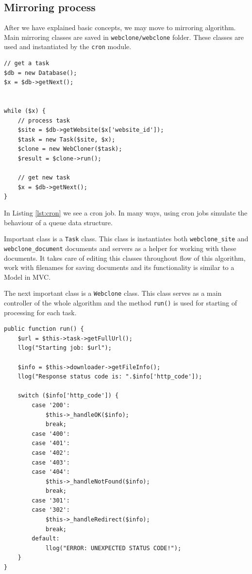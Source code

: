 \subsection{Mirroring process}
After we have explained basic concepts, we may move to mirroring algorithm. Main mirroring classes are saved in \texttt{webclone/webclone} folder. These classes are used and instantiated by the \texttt{cron} module.

\begin{lstlisting}[caption={Code executed for each document in cron},label={lst:cron}]
// get a task
$db = new Database();
$x = $db->getNext();


while ($x) {
    // process task
    $site = $db->getWebsite($x['website_id']);
    $task = new Task($site, $x);
    $clone = new WebCloner($task);
    $result = $clone->run();

    // get new task
    $x = $db->getNext();
}
\end{lstlisting}

In Listing \ref{lst:cron} we see a cron job. In many ways, using cron jobs simulate the behaviour of a queue data structure. 

Important class is a \texttt{Task} class. This class is instantiates both \texttt{webclone\_site} and \texttt{webclone\_document} documents and servers as a helper for working with these documents. It takes care of editing this classes throughout flow of this algorithm, work with filenames for saving documents and its functionality is similar to a Model in MVC.

The next important class is a \texttt{Webclone} class. This class serves as a main controller of the whole algorithm and the method \texttt{run()} is used for starting of processing for each task.

\begin{lstlisting}[caption={Handling of status codes returned by a server},label={lst:statusCodes}]
public function run() {
    $url = $this->task->getFullUrl();
    llog("Starting job: $url");

    $info = $this->downloader->getFileInfo();
    llog("Response status code is: ".$info['http_code']);

    switch ($info['http_code']) {
        case '200':
            $this->_handleOK($info);
            break;
        case '400':
        case '401':
        case '402':
        case '403':
        case '404':
            $this->_handleNotFound($info);
            break;
        case '301':
        case '302':
            $this->_handleRedirect($info);
            break;
        default:
            llog("ERROR: UNEXPECTED STATUS CODE!");
    }
}
\end{lstlisting}

